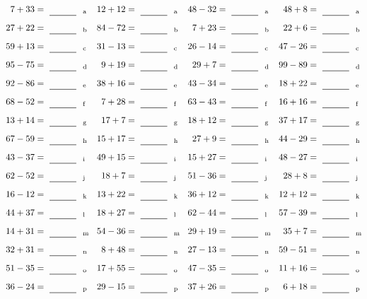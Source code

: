 \documentclass
[
  draft    = true,
  fontsize = 11pt,
  parskip  = half-
]
{scrartcl}
\begin{document}
\clearpage
\begin{align*}
    \pline{7+33}&=\rline{a}
  & \pline{12+12}&=\rline{a}
  & \pline{48-32}&=\rline{a}
  & \pline{48+8}&=\rline{a} \\[1ex]
    \pline{27+22}&=\rline{b}
  & \pline{84-72}&=\rline{b}
  & \pline{7+23}&=\rline{b}
  & \pline{22+6}&=\rline{b} \\[1ex]
    \pline{59+13}&=\rline{c}
  & \pline{31-13}&=\rline{c}
  & \pline{26-14}&=\rline{c}
  & \pline{47-26}&=\rline{c} \\[1ex]
    \pline{95-75}&=\rline{d}
  & \pline{9+19}&=\rline{d}
  & \pline{29+7}&=\rline{d}
  & \pline{99-89}&=\rline{d} \\[1ex]
    \pline{92-86}&=\rline{e}
  & \pline{38+16}&=\rline{e}
  & \pline{43-34}&=\rline{e}
  & \pline{18+22}&=\rline{e} \\[1ex]
    \pline{68-52}&=\rline{f}
  & \pline{7+28}&=\rline{f}
  & \pline{63-43}&=\rline{f}
  & \pline{16+16}&=\rline{f} \\[1ex]
    \pline{13+14}&=\rline{g}
  & \pline{17+7}&=\rline{g}
  & \pline{18+12}&=\rline{g}
  & \pline{37+17}&=\rline{g} \\[1ex]
    \pline{67-59}&=\rline{h}
  & \pline{15+17}&=\rline{h}
  & \pline{27+9}&=\rline{h}
  & \pline{44-29}&=\rline{h} \\[1ex]
    \pline{43-37}&=\rline{i}
  & \pline{49+15}&=\rline{i}
  & \pline{15+27}&=\rline{i}
  & \pline{48-27}&=\rline{i} \\[1ex]
    \pline{62-52}&=\rline{j}
  & \pline{18+7}&=\rline{j}
  & \pline{51-36}&=\rline{j}
  & \pline{28+8}&=\rline{j} \\[1ex]
    \pline{16-12}&=\rline{k}
  & \pline{13+22}&=\rline{k}
  & \pline{36+12}&=\rline{k}
  & \pline{12+12}&=\rline{k} \\[1ex]
    \pline{44+37}&=\rline{l}
  & \pline{18+27}&=\rline{l}
  & \pline{62-44}&=\rline{l}
  & \pline{57-39}&=\rline{l} \\[1ex]
    \pline{14+31}&=\rline{m}
  & \pline{54-36}&=\rline{m}
  & \pline{29+19}&=\rline{m}
  & \pline{35+7}&=\rline{m} \\[1ex]
    \pline{32+31}&=\rline{n}
  & \pline{8+48}&=\rline{n}
  & \pline{27-13}&=\rline{n}
  & \pline{59-51}&=\rline{n} \\[1ex]
    \pline{51-35}&=\rline{o}
  & \pline{17+55}&=\rline{o}
  & \pline{47-35}&=\rline{o}
  & \pline{11+16}&=\rline{o} \\[1ex]
    \pline{36-24}&=\rline{p}
  & \pline{29-15}&=\rline{p}
  & \pline{37+26}&=\rline{p}
  & \pline{6+18}&=\rline{p}
\end{align*}
\end{document}
